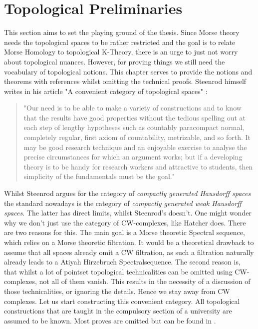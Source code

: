 \section{Topological Preliminaries}
This section aims to set the playing ground of the thesis. Since Morse theory needs the topological spaces to be rather restricted and the goal is to relate Morse Homology to topological K-Theory, there is an urge to just not worry about topological nuances. However, for proving things we still need the vocabulary of topological notions. This chapter serves to provide the notions and theorems with references whilst omitting the technical proofs. Steenrod himself writes in his article "A convenient category of topological spaces" \cite{Steenrod1967}:

\begin{quote}
"Our need is to be able to make a variety of constructions and to know that the results have good properties without the tedious spelling out at each step of lengthy hypotheses such as countably paracompact normal, completely regular, first axiom of countability, metrizable, and so forth. It may be good research technique and an enjoyable exercise to analyse the precise circumstances for which an argument works; but if a developing theory is to be handy for research workers and attractive to students, then simplicity of the fundamentals must be the goal."
\end{quote}
Whilst Steenrod argues for the category of \textit{compactly generated Hausdorff spaces} the standard nowadays is the category of \textit{compactly generated weak Hausdorff spaces}. The latter has direct limits, whilst Steenrod's doesn't. One might wonder why we don't just use the category of CW-complexes, like Hatcher does. There are two reasons for this. The main goal is a Morse theoretic Spectral sequence, which relies on a Morse theoretic filtration. It would be a theoretical drawback to assume that all spaces already omit a CW filtration, as such a filtration naturally already leads to a Atiyah Hirzebruch Spectralsequence. The second reason is, that whilst a lot of pointset topological technicalities can be omitted using CW-complexes, not all of them vanish. This results in the necessity of a discussion of those technicalities, or ignoring the details. Hence we stay away from CW complexes. Let us start constructing this convenient category. All topological constructions that are taught in the compulsory section of a university are assumed to be known. Most proves are omitted but can be found in \cite{strickland_cgwh}.
